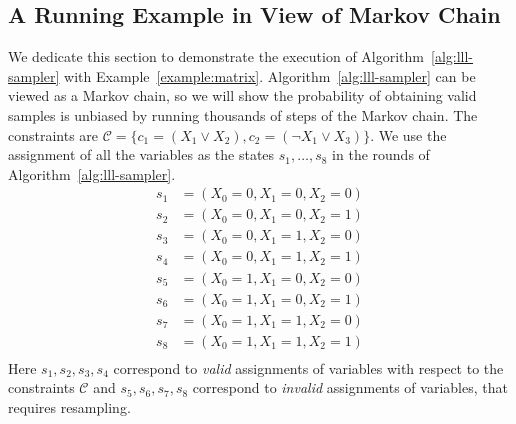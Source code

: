 \subsection{{A Running Example in View of Markov Chain}}
{We dedicate this section to demonstrate the execution of Algorithm~\ref{alg:lll-sampler} with Example~\ref{example:matrix}. Algorithm~\ref{alg:lll-sampler} can be viewed as a Markov chain, so  we will show the probability of obtaining valid samples is unbiased by running thousands of steps of the Markov chain. }
The constraints are $\mathcal{C}=\{c_1=(X_1\vee X_2), c_2=(\neg X_1 \vee X_3)\}$. We use the assignment of all the variables as the states $s_1,\ldots, s_8$ in the rounds of Algorithm~\ref{alg:lll-sampler}.
\begin{equation}
\begin{aligned}
s_1&=(X_0=0,X_1=0,X_2=0) \\
s_2&=(X_0=0,X_1=0,X_2=1) \\
s_3&=(X_0=0,X_1=1,X_2=0) \\
s_4&=(X_0=0,X_1=1,X_2=1) \\
s_5&=(X_0=1,X_1=0,X_2=0) \\
s_6&=(X_0=1,X_1=0,X_2=1) \\
s_7&=(X_0=1,X_1=1,X_2=0) \\
s_8&=(X_0=1,X_1=1,X_2=1) \\
\end{aligned}
\end{equation}
Here $s_1,s_2,s_3,s_4$ correspond to \textit{valid} assignments of variables with respect to the constraints $\mathcal{C}$ and $s_5,s_6,s_7,s_8$ correspond to \textit{invalid} assignments of variables, that requires resampling.

